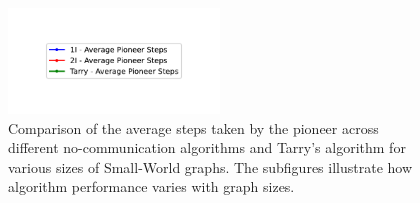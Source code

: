 \begin{figure}[H]
    \centering
    \qquad
    \qquad
    \includegraphics[width=0.5\textwidth]{Cap3/no_comm_steps_legend.pdf}
    \newline
    \qquad
    \newline
    \qquad
    \caption{Comparison of the average steps taken by the pioneer across different no-communication algorithms and Tarry's algorithm for various sizes of Small-World graphs. The subfigures illustrate how algorithm performance varies with graph sizes.}
    \label{fig_no_comm_steps_all_sizes_sw}
\end{figure}

